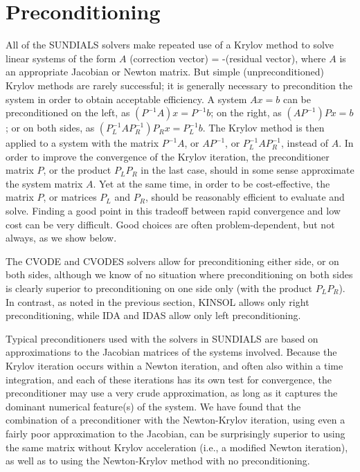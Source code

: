 \section{Preconditioning}\label{s:preconditioning}

All of the SUNDIALS solvers make repeated use of a Krylov method to
solve linear systems of the form $A$ (correction vector) =
-(residual vector), where $A$ is an appropriate Jacobian or Newton
matrix.  But simple (unpreconditioned) Krylov methods are rarely
successful; it is generally necessary to precondition the system
in order to obtain acceptable efficiency.  A system $A x = b$ can be
preconditioned on the left, as $(P^{-1}A) x = P^{-1} b$;
on the right, as $(A P^{-1}) P x = b$; or on both sides, as
$(P_L^{-1} A P_R^{-1}) P_R x = P_L^{-1}b$.  The Krylov method is then
applied to a system with the matrix $P^{-1}A$, or $AP^{-1}$, or
$P_L^{-1} A P_R^{-1}$, instead of $A$.  In order to improve the
convergence of the Krylov iteration, the preconditioner matrix $P$, or
the product $P_L P_R$ in the last case, should in some sense
approximate the system matrix $A$.  Yet at the same time, in order to
be cost-effective, the matrix $P$, or matrices $P_L$ and $P_R$, should
be reasonably efficient to evaluate and solve.  Finding a good point
in this tradeoff between rapid convergence and low cost can be very
difficult.  Good choices are often problem-dependent, but not always,
as we show below.

The CVODE and CVODES solvers allow for preconditioning either
side, or on both sides, although we know of no situation where
preconditioning on both sides is clearly superior to
preconditioning on one side only (with the product $P_L P_R$).  In
contrast, as noted in the previous section, KINSOL allows only
right preconditioning, while IDA and IDAS allow only left preconditioning.

Typical preconditioners used with the solvers in SUNDIALS are based on
approximations to the Jacobian matrices of the systems involved.
Because the Krylov iteration occurs within a Newton iteration, and
often also within a time integration, and each of these iterations has
its own test for convergence, the preconditioner may use a very crude
approximation, as long as it captures the dominant numerical
feature(s) of the system.  We have found that the combination of a
preconditioner with the Newton-Krylov iteration, using even a fairly
poor approximation to the Jacobian, can be surprisingly superior to
using the same matrix without Krylov acceleration (i.e., a modified
Newton iteration), as well as to using the Newton-Krylov method with
no preconditioning.

